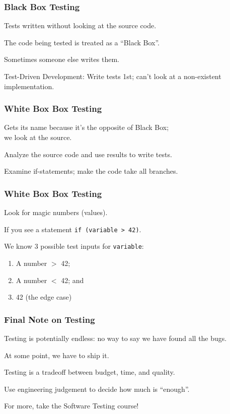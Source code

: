 \begin{frame}
\frametitle{Black Box Testing}
\begin{changemargin}{1cm}

Tests written without looking at the source code.

The code being tested is treated as a ``Black Box''.

Sometimes someone else writes them.

Test-Driven Development: Write tests 1st; can't look at a non-existent implementation.


\end{changemargin}
\end{frame}

\begin{frame}
\frametitle{White Box Box Testing}
\begin{changemargin}{1cm}

Gets its name because it's the opposite of Black Box;\\we look at the source.

Analyze the source code and use results to write tests. 

Examine if-statements; make the code take all branches.

\end{changemargin}
\end{frame}

\begin{frame}
\frametitle{White Box Box Testing}
\begin{changemargin}{1cm}

Look for magic numbers (values).

If you see a statement \texttt{if (variable > 42)}.

We know 3 possible test inputs for \texttt{variable}:
\begin{enumerate}
	\item A number $>$ 42;
    \item A number $<$ 42; and
    \item 42 (the edge case)
\end{enumerate}

\end{changemargin}
\end{frame}

\begin{frame}
\frametitle{Final Note on Testing}
\begin{changemargin}{1cm}

Testing is potentially endless: no way to say we have found all the bugs.

At some point, we have to ship it.

Testing is a tradeoff between budget, time, and quality.

Use engineering judgement to decide how much is ``enough''.

For more, take the Software Testing course!

\end{changemargin}
\end{frame}

